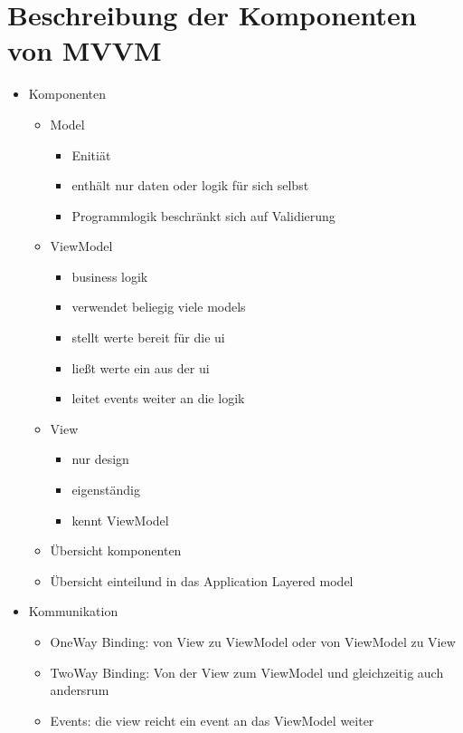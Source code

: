 \documentclass[titlepage=false,12pt]{scrreprt}
\begin{document}
	\chapter{Beschreibung der Komponenten von MVVM}
	\begin{itemize}
		\item Komponenten
		\begin{itemize}
			\item Model
			\begin{itemize}
				\item Enitiät
				\item enthält nur daten oder logik für sich selbst
				\item Programmlogik beschränkt sich auf Validierung
			\end{itemize}
			\item ViewModel
			\begin{itemize}
				\item business logik
				\item verwendet beliegig viele models
				\item stellt werte bereit für die ui
				\item ließt werte ein aus der ui
				\item leitet events weiter an die logik
			\end{itemize}
			\item View
			\begin{itemize}
				\item nur design
				\item eigenständig
				\item kennt ViewModel 
			\end{itemize}
			\item Übersicht komponenten
			\item Übersicht einteilund in das Application Layered model
		\end{itemize}
		\item Kommunikation
		\begin{itemize}
			\item OneWay Binding: von View zu ViewModel oder von ViewModel zu View
			\item TwoWay Binding: Von der View zum ViewModel und gleichzeitig auch andersrum
			\item Events: die view reicht ein event an das ViewModel weiter 
		\end{itemize}
	\end{itemize}
\end{document}
